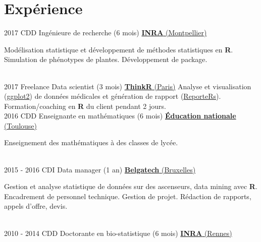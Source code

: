 \documentclass[letterpaper]{twentysecondcv} %
\begin{document}
\makeprofile %


\section{Expérience}

\begin{twenty} %
\twentyitem
    	{2017}
		{CDD}
        {Ingénieure de recherche \textnormal{(6 mois)}}
        {\href{https://www6.montpellier.inra.fr/mistea/}{\textbf{INRA} (Montpellier)}}
        {}
        {
        Modélisation statistique et développement de méthodes statistiques en \textbf{R}.
        Simulation de phénotypes de plantes. Développement de package.
      
        }
        \\
	\twentyitem
    	{2017}
		{Freelance}
        {Data scientist \textnormal{(3 mois)}}
        {\href{https://thinkr.fr/}{\textbf{ThinkR} (Paris)}}
        {}
        {
        {
        Analyse et visualisation (\href{https://ggplot2.tidyverse.org/}{ggplot2}) de données médicales et génération de rapport 
        (\href{https://davidgohel.github.io/ReporteRs/}{ReporteRs}). Formation/coaching en \textbf{R} du client pendant 2 jours.
        }
        }
    \\   
    \twentyitem
   		{2016}
		{CDD}
        {Enseignante en mathématiques \textnormal{(6 mois)}}
        {\href{http://www.ac-toulouse.fr/}{\textbf{Éducation nationale} (Toulouse)}}
        {}
        {
        Enseignement des mathématiques à des classes de lycée.
  
        }
     \\
     \twentyitem
   		{2015 - 2016}
		{CDI}
        {Data manager \textnormal{(1 an)}}
        {\href{https://www.belgatech-engineering.com/}{\textbf{Belgatech} (Bruxelles)}}
        {}
        {
        
        Gestion et analyse statistique de données sur des ascenseurs, data mining avec \textbf{R}. \\
        Encadrement de personnel technique. Gestion de projet. Rédaction de rapports, appels d’offre, devis.
    	}
    	    \\   
    \twentyitem
   		{2010 - 2014}
		{CDD}
        {Doctorante en bio-statistique \textnormal{(6 mois)}}
        {\href{https://www6.rennes.inra.fr/pegase}{\textbf{INRA} (Rennes)}}
        {}
        {
        
}
\end{twenty}
\end{document}
